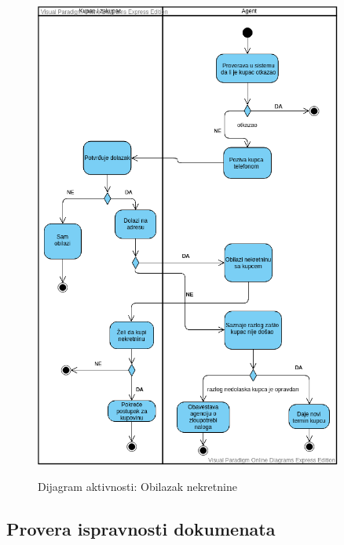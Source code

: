 \documentclass[20pt]{article}
\begin{document}
 
\newpage
\begin{figure}[h]
        \centering
        \includegraphics[width=0.9\textwidth,height=0.74\textheight]{Pictures/DijagramAktivnostiObilazakNekretnine.png}\\
        \caption{Dijagram aktivnosti: Obilazak nekretnine}
        \label{fig:dijagramAktivnostiObilazakNekretnine}
    \end{figure}
\newpage
\subsection{\bfseries \Large Provera ispravnosti dokumenata}
\setlength{\parindent}{1cm}
\fontsize{13}{18} \selectfont 
\end{document}
